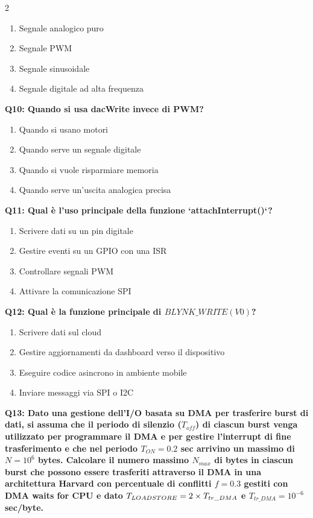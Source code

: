 \documentclass[10pt]{article}
\begin{document}
\begin{multicols}{2}
\begin{enumerate}[label=\arabic*.]
\item Segnale analogico puro
\item Segnale PWM
\item Segnale sinusoidale
\item Segnale digitale ad alta frequenza
\end{enumerate}
\textbf{Q10: Quando si usa dacWrite invece di PWM?}

\begin{enumerate}[label=\arabic*.]
\item Quando si usano motori
\item Quando serve un segnale digitale
\item Quando si vuole risparmiare memoria
\item Quando serve un’uscita analogica precisa
\end{enumerate}
\textbf{Q11: Qual è l’uso principale della funzione `attachInterrupt()`?}

\begin{enumerate}[label=\arabic*.]
\item Scrivere dati su un pin digitale
\item Gestire eventi su un GPIO con una ISR
\item Controllare segnali PWM
\item Attivare la comunicazione SPI
\end{enumerate}
\textbf{Q12: Qual è la funzione principale di $BLYNK\_WRITE(V0)$?}

\begin{enumerate}[label=\arabic*.]
\item Scrivere dati sul cloud
\item Gestire aggiornamenti da dashboard verso il dispositivo
\item Eseguire codice asincrono in ambiente mobile
\item Inviare messaggi via SPI o I2C
\end{enumerate}
\textbf{Q13: Dato una gestione dell’I/O basata su DMA per trasferire burst di dati, si assuma che il periodo di silenzio  ($T_{off}$) di ciascun burst venga utilizzato per programmare il DMA e per gestire l’interrupt di fine trasferimento e che nel periodo $T_{ON} = 0.2$ sec arrivino un massimo di $N=10^6$ bytes. Calcolare il numero massimo $N_{max}$ di bytes in ciascun burst che possono essere trasferiti attraverso il DMA in una architettura Harvard con percentuale di conflitti $f = 0.3$ gestiti con DMA waits for CPU e dato $T_{LOAD\/STORE} = 2 \times T_{tr\_DMA}$ e $T_{tr\_DMA} = 10^{-6}$ sec/byte.}


\end{multicols}
\end{document}
